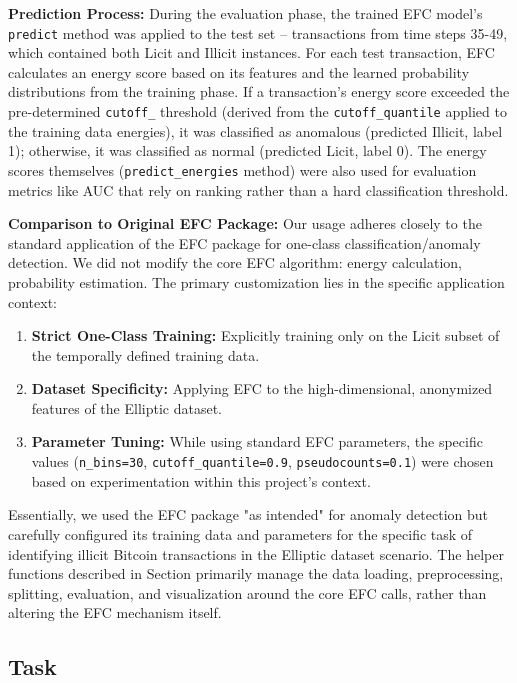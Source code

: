 \documentclass[12pt]{article}
\begin{document}
\textbf{Prediction Process:} During the evaluation phase, the trained EFC model's \texttt{predict} method was applied to
the test set -- transactions from time steps 35-49, which contained both Licit and Illicit instances. For each test
transaction, EFC calculates an energy score based on its features and the learned probability distributions from the
training phase. If a transaction's energy score exceeded the pre-determined \texttt{cutoff\_} threshold (derived from
the \texttt{cutoff\_quantile} applied to the training data energies), it was classified as anomalous (predicted Illicit,
label 1); otherwise, it was classified as normal (predicted Licit, label 0). The energy scores themselves
(\texttt{predict\_energies} method) were also used for evaluation metrics like AUC that rely on ranking rather than a
hard classification threshold.

\textbf{Comparison to Original EFC Package:} Our usage adheres closely to the standard application of the EFC package for
one-class classification/anomaly detection. We did not modify the core EFC algorithm: energy calculation, probability
estimation. The primary customization lies in the specific application context:

\begin{enumerate}
    \item \textbf{Strict One-Class Training:} Explicitly training only on the Licit subset of the temporally defined training data.
    \item \textbf{Dataset Specificity:} Applying EFC to the high-dimensional, anonymized features of the Elliptic dataset.
    \item \textbf{Parameter Tuning:} While using standard EFC parameters, the specific values (\texttt{n\_bins=30},
    \texttt{cutoff\_quantile=0.9}, \texttt{pseudocounts=0.1}) were chosen based on experimentation within this project's
    context.
\end{enumerate}

Essentially, we used the EFC package "as intended" for anomaly detection but carefully configured its training data and
parameters for the specific task of identifying illicit Bitcoin transactions in the Elliptic dataset scenario. The helper
functions described in Section \cite{sec:reproducibility} primarily manage the data loading, preprocessing, splitting, evaluation,
and visualization around the core EFC calls, rather than altering the EFC mechanism itself.


\subsection{Task} \label{subsec:task}
\end{document}
